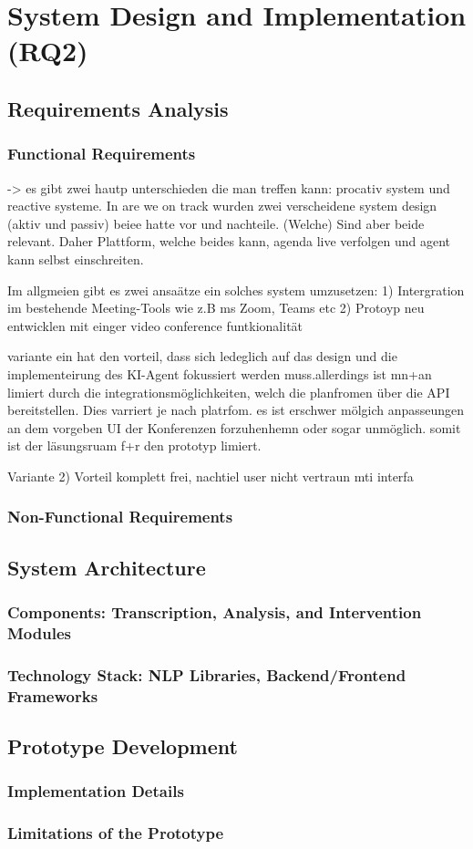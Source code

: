\chapter{System Design and Implementation (RQ2)}
\section{Requirements Analysis}
\label{sec:requirements-analysis}
\subsection{Functional Requirements}
-> es gibt zwei hautp unterschieden die man treffen kann: procativ system und reactive systeme. In are we on
track wurden zwei verscheidene system design (aktiv und passiv) beiee hatte vor und nachteile. (Welche)
Sind aber beide relevant.
Daher Plattform, welche beides kann, agenda live verfolgen und agent kann selbst einschreiten.

Im allgmeien gibt es zwei ansaätze ein solches system umzusetzen:
1) Intergration im bestehende Meeting-Tools wie z.B ms Zoom, Teams etc
2) Protoyp neu entwicklen mit einger video conference funtkionalität

variante ein hat den vorteil, dass sich ledeglich auf das design und die implementeirung des KI-Agent
fokussiert werden muss.allerdings ist mn+an limiert durch die integrationsmöglichkeiten, welch die planfromen
über die API bereitstellen. Dies varriert je nach platrfom. es ist erschwer mölgich anpasseungen an dem
vorgeben UI der Konferenzen forzuhenhemn oder sogar unmöglich. somit ist der läsungsruam  f+r den prototyp limiert.

Variante 2) Vorteil komplett frei, nachtiel user nicht vertraun mti interfa
\subsection{Non-Functional Requirements}
\section{System Architecture}
\subsection{Components: Transcription, Analysis, and Intervention Modules}
\subsection{Technology Stack: NLP Libraries, Backend/Frontend Frameworks}
\section{Prototype Development}
\subsection{Implementation Details}
\subsection{Limitations of the Prototype}